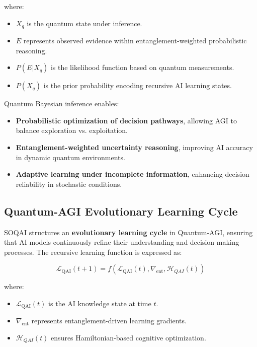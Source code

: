 \documentclass{article}
\theoremstyle{plain}
\begin{document}
where:
\begin{itemize}
    \item \( X_q \) is the quantum state under inference.
    \item \( E \) represents observed evidence within entanglement-weighted probabilistic reasoning.
    \item \( P(E | X_q) \) is the likelihood function based on quantum measurements.
    \item \( P(X_q) \) is the prior probability encoding recursive AI learning states.
\end{itemize}

Quantum Bayesian inference enables:
\begin{itemize}
    \item \textbf{Probabilistic optimization of decision pathways}, allowing AGI to balance exploration vs. exploitation.
    \item \textbf{Entanglement-weighted uncertainty reasoning}, improving AI accuracy in dynamic quantum environments.
    \item \textbf{Adaptive learning under incomplete information}, enhancing decision reliability in stochastic conditions.
\end{itemize}

\subsection{Quantum-AGI Evolutionary Learning Cycle}

SOQAI structures an \textbf{evolutionary learning cycle} in Quantum-AGI, ensuring that AI models continuously refine their understanding and decision-making processes. The recursive learning function is expressed as:

\begin{equation}
    \mathcal{L}_{\text{QAI}}(t+1) = f\left(\mathcal{L}_{\text{QAI}}(t), \nabla_{\text{ent}}, \mathcal{H}_{QAI}(t)\right)
\end{equation}

where:
\begin{itemize}
    \item \( \mathcal{L}_{\text{QAI}}(t) \) is the AI knowledge state at time \( t \).
    \item \( \nabla_{\text{ent}} \) represents entanglement-driven learning gradients.
    \item \( \mathcal{H}_{QAI}(t) \) ensures Hamiltonian-based cognitive optimization.
\end{itemize}
\end{document}
